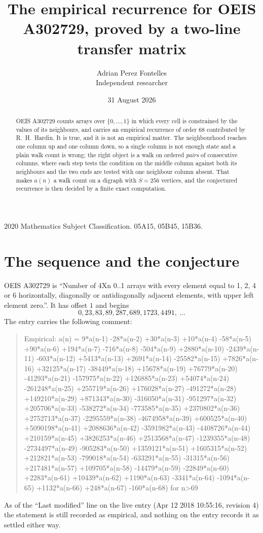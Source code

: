 \documentclass[11pt,a4paper]{article}
\title{The empirical recurrence for OEIS A302729, proved by a two-line transfer matrix}
\author{Adrian Perez Fontelles\\ \small Independent researcher}
\date{31 August 2026}
\theoremstyle{plain}
\theoremstyle{definition}
\begin{document}
\maketitle

\begin{abstract}
OEIS A302729 counts arrays over $\{0,\dots,1\}$ in which every cell is constrained by the
values of its neighbours, and carries an empirical recurrence of order $68$ contributed
by R.~H.~Hardin. It is true, and it is not an empirical matter. The neighbourhood reaches one
column up and one column down, so a single column is not enough state and a plain walk count
is wrong; the right object is a walk on ordered \emph{pairs} of consecutive columns, where
each step tests the condition on the middle column against both its neighbours and the two
ends are tested with one neighbour column absent. That makes $a(n)$ a walk count on a digraph
with $S=256$ vertices, and the conjectured recurrence is then decided by a finite exact
computation.
\end{abstract}

\noindent\small 2020 Mathematics Subject Classification. 05A15, 05B45, 15B36.\normalsize

\section{The sequence and the conjecture}

OEIS A302729 is ``Number of 4Xn 0..1 arrays with every element equal to 1, 2, 4 or 6 horizontally, diagonally or antidiagonally adjacent elements, with upper left element zero.''. It has offset $1$ and begins
\[
0, 23, 83, 89, 287, 689, 1723, 4491,\ \dots
\]
The entry carries the following comment:
\begin{quote}\small
Empirical: a(n) = 9*a(n-1) -28*a(n-2) +30*a(n-3) +10*a(n-4) -58*a(n-5) +90*a(n-6) +194*a(n-7) -716*a(n-8) -504*a(n-9) +2880*a(n-10) -2439*a(n-11) -603*a(n-12) +5413*a(n-13) +2691*a(n-14) -25582*a(n-15) +7826*a(n-16) +32125*a(n-17) -38449*a(n-18) +15678*a(n-19) +76779*a(n-20) -41293*a(n-21) -157975*a(n-22) +126885*a(n-23) +54074*a(n-24) -261248*a(n-25) +255719*a(n-26) +176028*a(n-27) -491272*a(n-28) +149210*a(n-29) +871343*a(n-30) -316050*a(n-31) -951297*a(n-32) +205706*a(n-33) -538272*a(n-34) -773585*a(n-35) +2370802*a(n-36) +2752713*a(n-37) -2295559*a(n-38) -4674958*a(n-39) +600525*a(n-40) +5090198*a(n-41) +2088636*a(n-42) -3591982*a(n-43) -4408726*a(n-44) +210159*a(n-45) +3826253*a(n-46) +2513568*a(n-47) -1239355*a(n-48) -2734497*a(n-49) -905283*a(n-50) +1359121*a(n-51) +1605315*a(n-52) +212821*a(n-53) -799018*a(n-54) -633291*a(n-55) -31315*a(n-56) +217481*a(n-57) +109705*a(n-58) -14479*a(n-59) -22849*a(n-60) +2283*a(n-61) +10439*a(n-62) +1190*a(n-63) -3341*a(n-64) -1094*a(n-65) +1132*a(n-66) +248*a(n-67) -160*a(n-68) for n>69
\end{quote}
As of the ``Last modified'' line on the live entry (Apr 12 2018 10:55:16, revision 4) the statement is
still recorded as empirical, and nothing on the entry records it as settled either way.
\end{document}
